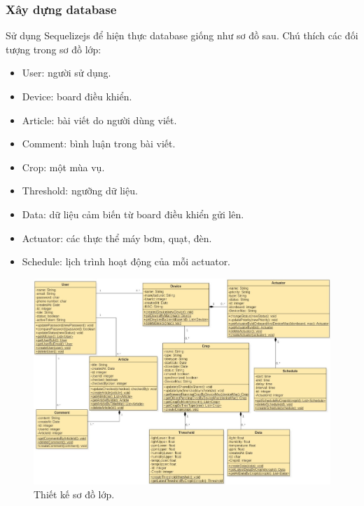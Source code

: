 \documentclass[a4paper,12pt,oneside]{article}
\begin{document}
\subsubsection{Xây dựng database}
\noindent Sử dụng Sequelizejs để hiện thực database giống như sơ đồ sau.
Chú thích các đối tượng trong sơ đồ lớp:
\begin{itemize}
\item User: người sử dụng.
\item Device: board điều khiển.
\item Article: bài viết do người dùng viết.
\item Comment: bình luận trong bài viết.
\item Crop: một mùa vụ.
\item Threshold: ngưỡng dữ liệu.
\item Data: dữ liệu cảm biến từ board điều khiển gửi lên.
\item Actuator: các thực thể máy bơm, quạt, đèn.
\item Schedule: lịch trình hoạt động của mỗi actuator.
\end{itemize}
\begin{landscape}
\begin{figure}[b]
\centering
\includegraphics[scale=0.62]{hinh/class_diagram.jpg}
\caption{Thiết kế sơ đồ lớp.}
\end{figure}
\end{landscape}
\end{document}
